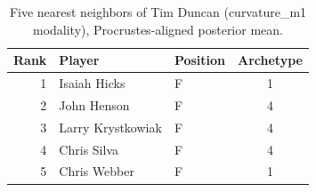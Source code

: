 \begin{table}[htbp]
  \centering\small
  \begin{tabular}{rllc}
    \toprule
    Rank & Player & Position & Archetype \\
    \midrule
    1 & Isaiah Hicks & F & 1 \\
    2 & John Henson & F & 4 \\
    3 & Larry Krystkowiak & F & 4 \\
    4 & Chris Silva & F & 4 \\
    5 & Chris Webber & F & 1 \\
    \bottomrule
  \end{tabular}
  \caption{Five nearest neighbors of Tim Duncan (curvature_m1 modality), Procrustes-aligned posterior mean.}
  \label{tab:Tim_Duncan_neighbors_curvature_m1}
\end{table}

